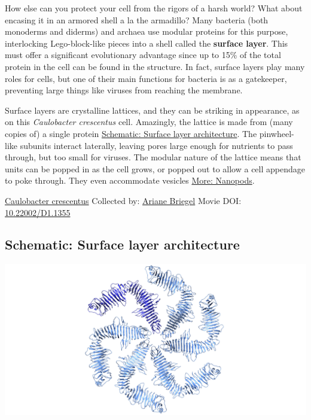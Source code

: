 \documentclass[]{tufte-book}
\begin{document}
How else can you protect your cell from the rigors of a harsh world? What about encasing it in an armored shell a la the armadillo? Many bacteria (both monoderms and diderms) and archaea use modular proteins for this purpose, interlocking Lego-block-like pieces into a shell called the \textbf{surface layer}. This must offer a significant evolutionary advantage since up to 15\% of the total protein in the cell can be found in the structure. In fact, surface layers play many roles for cells, but one of their main functions for bacteria is as a gatekeeper, preventing large things like viruses from reaching the membrane.

Surface layers are crystalline lattices, and they can be striking in appearance, as on this \emph{Caulobacter crescentus} cell. Amazingly, the lattice is made from (many copies of) a single protein \protect\hyperlink{Surface_layer_architecture}{Schematic: Surface layer architecture}. The pinwheel-like subunits interact laterally, leaving pores large enough for nutrients to pass through, but too small for viruses. The modular nature of the lattice means that units can be popped in as the cell grows, or popped out to allow a cell appendage to poke through. They even accommodate vesicles \protect\hyperlink{Nanopods}{More: Nanopods}.



\hypertarget{htmlwidget-7384aff4c8a6ff6c45e0}{}

\label{fig:2-6}\protect\hyperlink{tree}{Caulobacter crescentus} Collected by: \protect\hyperlink{ariane_briegel}{Ariane Briegel} Movie DOI: \href{https://doi.org/10.22002/D1.1355}{10.22002/D1.1355}

\hypertarget{Surface_layer_architecture}{%
\subsection*{Schematic: Surface layer architecture}\label{Surface_layer_architecture}}

\includegraphics{img/schematics/2_6_1}
\end{document}
